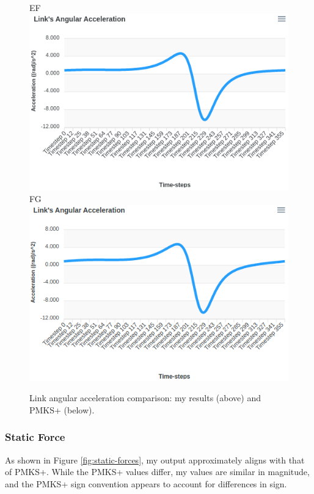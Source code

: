 \documentclass[12pt]{article}
\newcommand\hs{\hspace{1cm}}
\begin{document}
\begin{figure}[ht]
  EF \includegraphics[scale=0.35]{../pmks-plots/angLinkAcc/angLinkAccEF.png}%
  \hs FG \includegraphics[scale=0.35]{../pmks-plots/angLinkAcc/angLinkAccFG.png}%
  \caption{\label{fig:compare.angLinkAcc}Link angular acceleration comparison: my results (above) and PMKS+ (below).}
\end{figure}


\subsubsection{Static Force}%
\label{res.compare.static-force}

As shown in Figure \ref{fig:static-forces}, my output approximately aligns with that of PMKS+. While the PMKS+ values differ, my values are similar in magnitude, and the PMKS+ sign convention appears to account for differences in sign.
\end{document}
